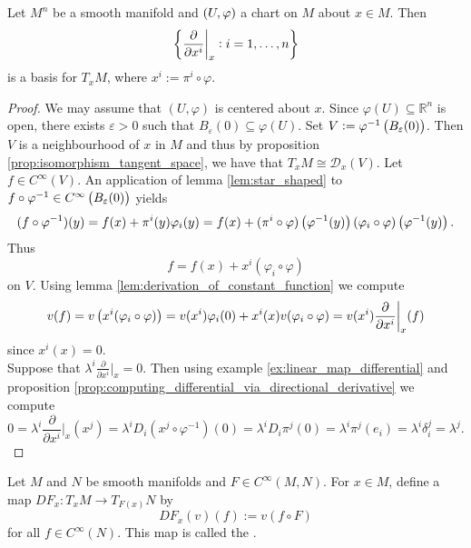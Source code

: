 \begin{proposition}
	Let $M^n$ be a smooth manifold and $\del[0]{U,\varphi}$ a chart on $M$ about $x \in M$. Then 
	\begin{equation*}
		\cbr[3]{\frac{\partial}{\partial x^i}\bigg\vert_x : i = 1,\dots,n}
	\end{equation*}
	\noindent is a basis for $T_xM$, where $x^i := \pi^i \circ \varphi$.
\end{proposition}

\begin{proof}
	We may assume that $(U,\varphi)$ is centered about $x$. Since $\varphi(U) \subseteq \mathbb{R}^n$ is open, there exists $\varepsilon > 0$ such that $B_\varepsilon(0) \subseteq \varphi(U)$. Set $V := \varphi^{-1}\del[1]{B_\varepsilon(0)}$. Then $V$ is a neighbourhood of $x$ in $M$ and thus by proposition \ref{prop:isomorphism_tangent_space}, we have that $T_xM \cong \mathcal{D}_x(V)$. Let $f \in C^\infty(V)$. An application of lemma \ref{lem:star_shaped} to $f \circ \varphi^{-1} \in C^\infty\del[1]{B_\varepsilon(0)}$ yields
	\begin{align*}
		(f \circ \varphi^{-1})(y) = f(x) + \pi^i(y)\varphi_i(y) = f(x) + (\pi^i \circ \varphi)\del[1]{\varphi^{-1}(y)}(\varphi_i \circ \varphi)\del[1]{\varphi^{-1}(y)}.
	\end{align*}
	Thus 
	\begin{equation*}
		f = f(x) + x^i(\varphi_i \circ \varphi) 
	\end{equation*}
	\noindent on $V$. Using lemma \ref{lem:derivation_of_constant_function} we compute
	\begin{equation*}
		v(f) = v\del[1]{x^i(\varphi_i \circ \varphi)} = v(x^i)\varphi_i(0) + x^i(x)v(\varphi_i \circ \varphi) = v(x^i)\frac{\partial}{\partial x^i}\bigg\vert_x(f)
	\end{equation*}
	\noindent since $x^i(x) = 0$.\\
	Suppose that $\lambda^i\frac{\partial}{\partial x^i}\big\vert_x = 0$. Then using example \ref{ex:linear_map_differential} and proposition \ref{prop:computing_differential_via_directional_derivative} we compute
	\begin{equation*}
		0 = \lambda^i\frac{\partial}{\partial x^i}\bigg\vert_x(x^j) = \lambda^i D_i(x^j \circ \varphi^{-1})(0) = \lambda^i D_i\pi^j(0) = \lambda^i \pi^j(e_i) = \lambda^i \delta^j_i = \lambda^j.
	\end{equation*}
\end{proof}

\begin{definition}[Differential]
	Let $M$ and $N$ be smooth manifolds and $F \in C^\infty(M,N)$. For $x \in M$, define a map $DF_x : T_xM \to T_{F(x)}N$ by
	\begin{equation*}
		DF_x(v)(f) := v(f \circ F)
	\end{equation*}
	\noindent for all $f \in C^\infty(N)$. This map is called the .
\end{definition}

